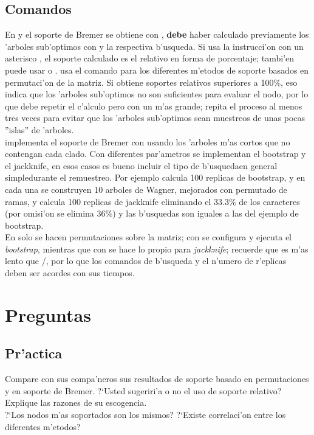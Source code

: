 \subsection{Comandos}
En  y  el soporte de Bremer se obtiene con , \textbf{debe} haber calculado previamente los 'arboles  sub'optimos con  y la respectiva b'usqueda. Si usa la instrucci'on con un asterisco , el soporte calculado es el relativo en forma de porcentaje; tambi'en puede usar \Cmd{bsupport [;} o \Cmd{bsupport ];}.  usa el comando  para los diferentes m'etodos de soporte basados en permutaci'on de la matriz. Si obtiene soportes relativos superiores a 100\%, eso indica que los 'arboles sub'optimos no son suficientes para evaluar el nodo, por lo que debe repetir el c'alculo pero con un  m'as grande; repita el proceso al menos tres veces para evitar que los 'arboles sub'optimos sean muestreos de unas pocas ''islas'' de 'arboles.\\
 implementa el soporte de Bremer con  usando los 'arboles m'as cortos que no contengan cada clado. Con diferentes par'ametros se implementan el bootstrap y el jackknife, en esos casos es bueno incluir el tipo de b'usquedaen general simpledurante el remuestreo. Por ejemplo  calcula 100 replicas de bootstrap, y en cada una se construyen 10 arboles de Wagner, mejorados con permutado de ramas, y  calcula 100 replicas de jackknife eliminando el 33.3\% de los caracteres (por omisi'on se elimina 36\%) y las b'usquedas son iguales a las del ejemplo de bootstrap.\\
En  solo se hacen permutaciones sobre la matriz; con  se configura y ejecuta el \textit{bootstrap}, mientras que con   se hace lo propio para \textit{jackknife}; recuerde que  es m'as lento que /, por lo que los comandos de b'usqueda y el n'umero de r'eplicas deben ser acordes con sus tiempos.
\section{Preguntas}
\subsection{Pr'actica}
\noindent
Compare con sus compa'neros sus resultados de soporte basado en permutaciones y en soporte de Bremer. ?`Usted sugeriri'a o no el uso de soporte relativo? Explique las razones de su escogencia.\\
?`Los nodos m'as soportados son los mismos? ?`Existe correlaci'on entre los diferentes m'etodos?
